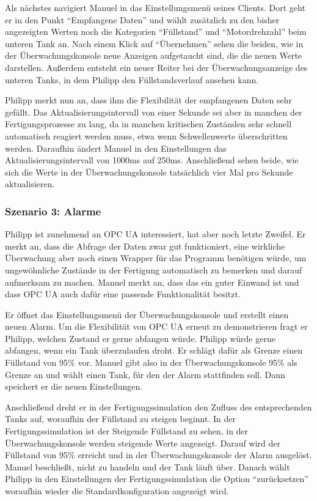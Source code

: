 \documentclass[parskip=full]{scrartcl}
\begin{document}
Als nächstes navigiert Manuel in das Einstellungsmenü seines Clients. Dort geht er in den Punkt ``Empfangene Daten'' und
wählt zusätzlich zu den bisher angezeigten Werten noch die Kategorien ``Füllstand'' und ``Motordrehzahl'' beim unteren Tank
an. Nach einem Klick auf ``Übernehmen'' sehen die beiden, wie in der Überwachungskonsole neue Anzeigen aufgetaucht sind,
die die neuen Werte darstellen. Außerdem entsteht ein neuer Reiter bei der Überwachungsanzeige des unteren Tanks,
in dem Philipp den Füllstandsverlauf ansehen kann.

Philipp merkt nun an, dass ihm die Flexibilität der empfangenen Daten sehr gefällt. Das Aktualisierungsintervall von
einer Sekunde sei aber in manchen der Fertigungsprozesse zu lang, da in manchen kritischen Zuständen sehr schnell
automatisch reagiert werden muss, etwa wenn Schwellenwerte überschritten werden. Daraufhin ändert Manuel in den
Einstellungen das Aktualisierungsintervall von 1000ms auf 250ms. Anschließend sehen beide, wie sich die Werte in der
Überwachungskonsole tatsächlich vier Mal pro Sekunde aktualisieren.

\subsubsection{Szenario 3: Alarme}
Philipp ist zunehmend an OPC UA interessiert, hat aber noch letzte Zweifel. Er merkt an, dass die Abfrage der Daten
zwar gut funktioniert, eine wirkliche \"Uberwachung aber noch einen Wrapper f\"ur das Programm ben\"otigen w\"urde,
um ungew\"ohnliche Zust\"ande in der Fertigung automatisch zu bemerken und darauf aufmerksam zu machen.
Manuel merkt an, dass das ein guter Einwand ist und dass OPC UA auch daf\"ur eine passende Funktionalit\"at besitzt.

Er \"offnet das Einstellungsmen\"u der \"Uberwachungskonsole und erstellt einen neuen Alarm. Um die Flexibilit\"at
von OPC UA erneut zu demonstrieren fragt er Philipp, welchen Zustand er gerne abfangen w\"urde. Philipp w\"urde gerne
abfangen, wenn ein Tank \"uberzulaufen droht. Er schl\"agt daf\"ur als Grenze einen F\"ullstand von 95\% vor.
Manuel gibt also in der \"Uberwachungskonsole 95\% als Grenze an und w\"ahlt einen Tank, f\"ur den der Alarm stattfinden soll.
Dann speichert er die neuen Einstellungen.

Anschlie{\ss}end dreht er in der Fertigungssimulation den Zufluss des entsprechenden Tanks auf, woraufhin der F\"ullstand
zu steigen beginnt. In der Fertigungssimulation ist der Steigende F\"ullstand zu sehen, in der \"Uberwachungskonsole werden
steigende Werte angezeigt.
Darauf wird der F\"ullstand von 95\% erreicht und in der \"Uberwachungskonsole der Alarm ausgel\"ost. Manuel
beschlie{\ss}t, nicht zu handeln und der Tank l\"auft \"uber. Danach w\"ahlt Philipp in den Einstellungen der
Fertigungssimulation die Option ``zur\"ucksetzen'' woraufhin wieder die Standardkonfiguration angezeigt wird.
\end{document}
